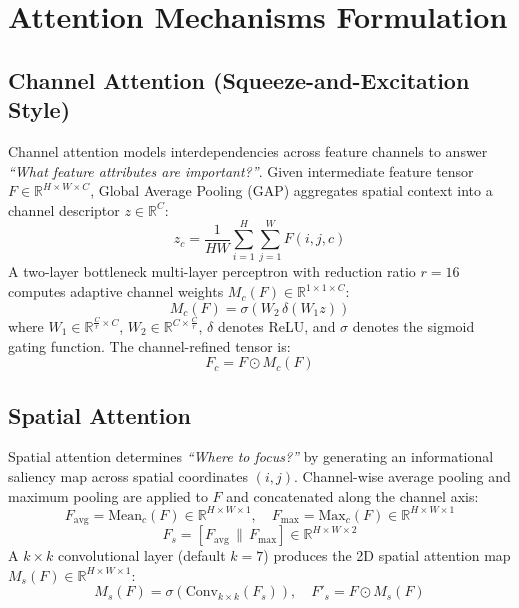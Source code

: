 \documentclass[11pt,a4paper]{article}
\begin{document}
\section{Attention Mechanisms Formulation}

\subsection{Channel Attention (Squeeze-and-Excitation Style)}
Channel attention models interdependencies across feature channels to answer \textit{``What feature attributes are important?''}. Given intermediate feature tensor $F \in \mathbb{R}^{H \times W \times C}$, Global Average Pooling (GAP) aggregates spatial context into a channel descriptor $z \in \mathbb{R}^C$:
\begin{equation}
z_c = \frac{1}{HW} \sum_{i=1}^H \sum_{j=1}^W F(i, j, c)
\end{equation}
A two-layer bottleneck multi-layer perceptron with reduction ratio $r=16$ computes adaptive channel weights $M_c(F) \in \mathbb{R}^{1 \times 1 \times C}$:
\begin{equation}
M_c(F) = \sigma\left(W_2 \, \delta(W_1 z)\right)
\end{equation}
where $W_1 \in \mathbb{R}^{\frac{C}{r} \times C}$, $W_2 \in \mathbb{R}^{C \times \frac{C}{r}}$, $\delta$ denotes ReLU, and $\sigma$ denotes the sigmoid gating function. The channel-refined tensor is:
\begin{equation}
F_c = F \odot M_c(F)
\end{equation}

\subsection{Spatial Attention}
Spatial attention determines \textit{``Where to focus?''} by generating an informational saliency map across spatial coordinates $(i, j)$. Channel-wise average pooling and maximum pooling are applied to $F$ and concatenated along the channel axis:
\begin{equation}
F_{\text{avg}} = \text{Mean}_c(F) \in \mathbb{R}^{H \times W \times 1}, \quad F_{\text{max}} = \text{Max}_c(F) \in \mathbb{R}^{H \times W \times 1}
\end{equation}
\begin{equation}
F_s = [F_{\text{avg}} \,\|\, F_{\text{max}}] \in \mathbb{R}^{H \times W \times 2}
\end{equation}
A $k \times k$ convolutional layer (default $k=7$) produces the 2D spatial attention map $M_s(F) \in \mathbb{R}^{H \times W \times 1}$:
\begin{equation}
M_s(F) = \sigma\left(\text{Conv}_{k \times k}(F_s)\right), \quad F'_s = F \odot M_s(F)
\end{equation}
\end{document}
